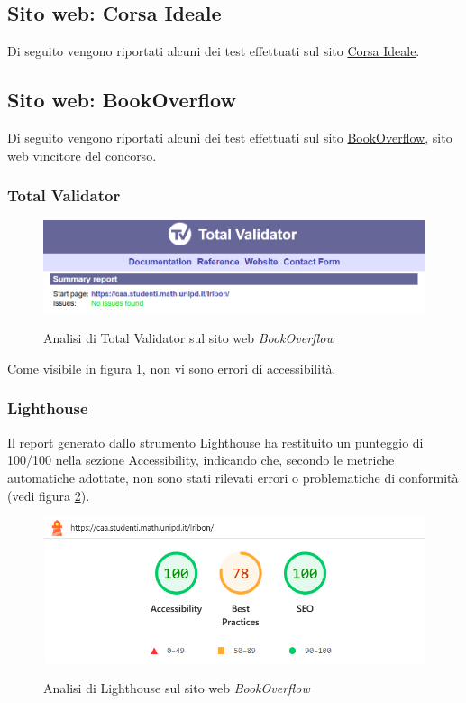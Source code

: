 \subsection{Sito web: Corsa Ideale}
\noindent Di seguito vengono riportati alcuni dei test effettuati sul sito \href{https://caa.studenti.math.unipd.it/epinarel/}{Corsa Ideale}.

\subsection{Sito web: BookOverflow}
\noindent Di seguito vengono riportati alcuni dei test effettuati sul sito \href{https://caa.studenti.math.unipd.it/lribon/}{BookOverflow}, sito web vincitore del concorso.
\subsubsection{Total Validator}
\begin{figure}[H]
    \centering
    \includegraphics[width=0.8\linewidth, alt={Screenshot dell'analisi di Total Validator sul sito web BookOverflow}]{img/TV_bookoverflow.png}
    \caption{Analisi di Total Validator sul sito web \textit{BookOverflow}}\label{fig:TV_bookoverflow}
\end{figure}

\noindent Come visibile in figura \ref{fig:TV_bookoverflow}, non vi sono errori di accessibilità.

\subsubsection{Lighthouse}
\noindent Il report generato dallo strumento Lighthouse ha restituito un punteggio di 100/100 nella sezione Accessibility, indicando che, secondo le metriche automatiche adottate, non sono stati rilevati errori o problematiche di conformità (vedi figura \ref{fig:Lighthouse_bookoverflow}).
\begin{figure}[H]
    \centering
    \includegraphics[width=0.6\linewidth, alt={Screenshot dell'analisi di Lighthouse sul sito web BookOverflow}]{img/Lighthouse_bookoverflow.png}
    \caption{Analisi di Lighthouse sul sito web \textit{BookOverflow}}\label{fig:Lighthouse_bookoverflow}
\end{figure}

